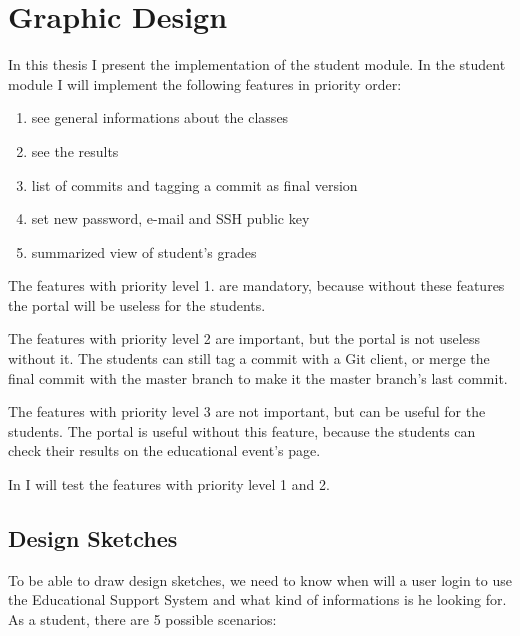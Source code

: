 \chapter{Graphic Design}

In this thesis I present the implementation of the student module. In the student module I will implement the following features in priority order:
\begin{enumerate}
	\item see general informations about the classes
	\setcounter{enumi}{0}
	\item see the results
	\item list of commits and tagging a commit as final version
	\setcounter{enumi}{1}
	\item set new password, e-mail and SSH public key
	\item summarized view of student's grades
\end{enumerate}

The features with priority level 1. are mandatory, because without these features the portal will be useless for the students.

The features with priority level 2 are important, but the portal is not useless without it. The students can still tag a commit with a Git client, or merge the final commit with the master branch to make it the master branch's last commit. 

The features with priority level 3 are not important, but can be useful for the students. The portal is useful without this feature, because the students can check their results on the educational event's page.

In  I will test the features with priority level 1 and 2.


\section{Design Sketches}
To be able to draw design sketches, we need to know when will a user login to use the Educational Support System and what kind of informations is he looking for. As a student, there are 5 possible scenarios:

